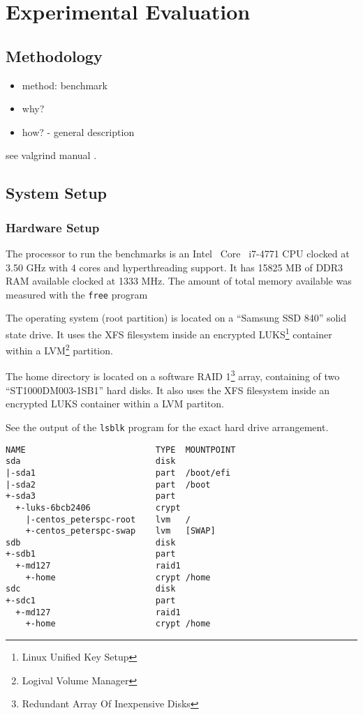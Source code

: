 \chapter{Experimental Evaluation}

\section{Methodology}

\begin{itemize}
  \item method: benchmark
  \item why?
  \item how? - general description
\end{itemize}

see valgrind manual \cite{valgrind}.

\section{System Setup}
  \subsection{Hardware Setup}

The processor to run the benchmarks is an Intel\textregistered~ Core\texttrademark~ i7-4771 CPU clocked at 3.50 GHz with 4 cores and hyperthreading support.
It has 15825 MB of DDR3 RAM available clocked at 1333 MHz.
The amount of total memory available was measured with the \texttt{free} program

The operating system (root partition) is located on a ``Samsung SSD 840'' solid state drive.
It uses the XFS filesystem inside an encrypted LUKS\footnote{Linux Unified Key Setup} container within a LVM\footnote{Logival Volume Manager} partition.

The home directory is located on a software RAID 1\footnote{Redundant Array Of Inexpensive Disks} array, containing of two ``ST1000DM003-1SB1'' hard disks.
It also uses the XFS filesystem inside an encrypted LUKS container within a LVM partiton.

See the output of the \texttt{lsblk} program for the exact hard drive arrangement.

\begin{lstlisting}[caption={Disk arrangement on the benchmark machine}]
NAME                          TYPE  MOUNTPOINT
sda                           disk
|-sda1                        part  /boot/efi
|-sda2                        part  /boot
+-sda3                        part
  +-luks-6bcb2406             crypt
    |-centos_peterspc-root    lvm   /
    +-centos_peterspc-swap    lvm   [SWAP]
sdb                           disk
+-sdb1                        part
  +-md127                     raid1
    +-home                    crypt /home
sdc                           disk
+-sdc1                        part
  +-md127                     raid1
    +-home                    crypt /home
\end{lstlisting}

